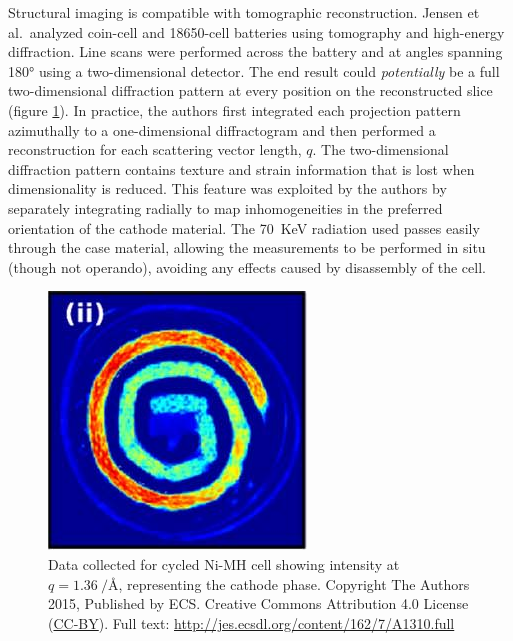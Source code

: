 \documentclass[journal=cmatex,manuscript=perspective]{achemso}
\begin{document}
Structural imaging is compatible with tomographic reconstruction.
Jensen et al.\ analyzed coin-cell and 18650-cell batteries using
tomography and high-energy diffraction\cite{jensen2015}. Line scans
were performed across the battery and at angles spanning \ang{180}
using a two-dimensional detector. The end result could
\emph{potentially} be a full two-dimensional diffraction pattern at
every position on the reconstructed slice (figure
\ref{figure:jensen2015}). In practice, the authors first integrated
each projection pattern azimuthally to a one-dimensional diffractogram
and then performed a reconstruction for each scattering vector length,
$q$. The two-dimensional diffraction pattern contains texture and
strain information that is lost when dimensionality is
reduced\cite{bobhe}. This feature was exploited by the authors by
separately integrating radially to map inhomogeneities in the
preferred orientation of the  cathode material. The
\SI{70}{KeV} radiation used passes easily through the case material,
allowing the measurements to be performed in situ (though not
operando), avoiding any effects caused by disassembly of the cell.

\begin{figure}
  \includegraphics[width=\textwidth]{jensen2015.png}
  \caption{Data collected for cycled Ni-MH cell showing intensity at
    $q = \SI{1.36}{\per\angstrom}$, representing the cathode
    phase.\cite{jensen2015} Copyright The Authors 2015, Published by
    ECS. Creative Commons Attribution 4.0 License
    (\href{http://creativecommons.org/licenses/by/4.0/}{CC-BY}). Full
    text: \url{http://jes.ecsdl.org/content/162/7/A1310.full}}
  \label{figure:jensen2015}
\end{figure}
\end{document}

